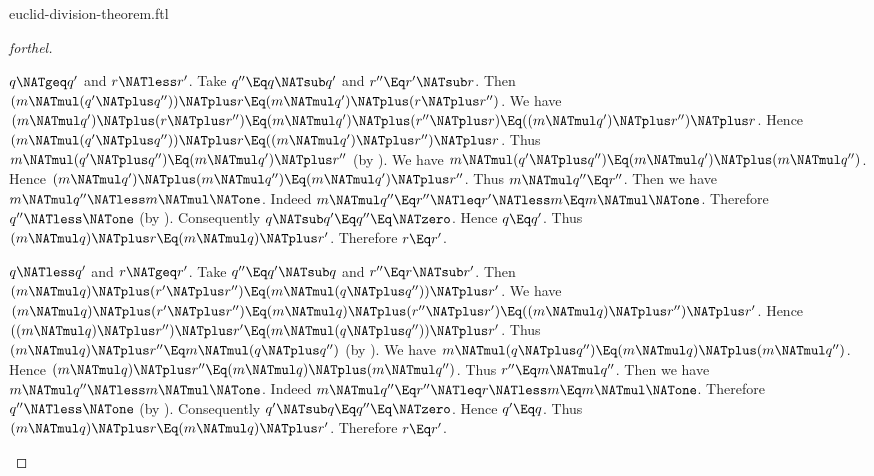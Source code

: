 \documentclass{stex}
\begin{document}
\begin{smodule}{euclid-division-theorem.ftl}
\begin{proof}[forthel]
  \begin{case}{$q \NATgeq q'$ and $r \NATless r'$.}
    Take $q'' \Eq q \NATsub q'$ and $r'' \Eq r' \NATsub r$.
    Then $(m \NATmul (q' \NATplus q'')) \NATplus r \Eq (m \NATmul q') \NATplus (r \NATplus r'')$.
    We have $(m \NATmul q') \NATplus (r \NATplus r'')
      \Eq (m \NATmul q') \NATplus (r'' \NATplus r)
      \Eq ((m \NATmul q') \NATplus r'') \NATplus r$.
    Hence $(m \NATmul (q' \NATplus q'')) \NATplus r \Eq ((m \NATmul q') \NATplus r'') \NATplus r$.
    Thus $m \NATmul (q' \NATplus q'') \Eq (m \NATmul q') \NATplus r''$ (by ).
    We have $m \NATmul (q' \NATplus q'') \Eq (m \NATmul q') \NATplus (m \NATmul q'')$.
    Hence $(m \NATmul q') \NATplus (m \NATmul q'') \Eq (m \NATmul q') \NATplus r''$.
    Thus $m \NATmul q'' \Eq r''$.
    Then we have $m \NATmul q'' \NATless m \NATmul \NATone$.
    Indeed $m \NATmul q''
      \Eq r''
      \NATleq r'
      \NATless m
      \Eq m \NATmul \NATone$.
    Therefore $q'' \NATless \NATone$ (by ).
    Consequently $q \NATsub q' \Eq q'' \Eq \NATzero$.
    Hence $q \Eq q'$.
    Thus $(m \NATmul q) \NATplus r \Eq (m \NATmul q) \NATplus r'$.
    Therefore $r \Eq r'$.
  \end{case}

  \begin{case}{$q \NATless q'$ and $r \NATgeq r'$.}
    Take $q'' \Eq q' \NATsub q$ and $r'' \Eq r \NATsub r'$.
    Then $(m \NATmul q) \NATplus (r' \NATplus r'') \Eq (m \NATmul (q \NATplus q'')) \NATplus r'$.
    We have $(m \NATmul q) \NATplus (r' \NATplus r'')
      \Eq (m \NATmul q) \NATplus (r'' \NATplus r')
      \Eq ((m \NATmul q) \NATplus r'') \NATplus r'$.
    Hence $((m \NATmul q) \NATplus r'') \NATplus r' \Eq (m \NATmul (q \NATplus q'')) \NATplus r'$.
    Thus $(m \NATmul q) \NATplus r'' \Eq m \NATmul (q \NATplus q'')$ (by ).
    We have $m \NATmul (q \NATplus q'') \Eq (m \NATmul q) \NATplus (m \NATmul q'')$.
    Hence $(m \NATmul q) \NATplus r'' \Eq (m \NATmul q) \NATplus (m \NATmul q'')$.
    Thus $r'' \Eq m \NATmul q''$.
    Then we have $m \NATmul q'' \NATless m \NATmul \NATone$.
    Indeed $m \NATmul q''
      \Eq r''
      \NATleq r
      \NATless m
      \Eq m \NATmul \NATone$.
    Therefore $q'' \NATless \NATone$ (by ).
    Consequently $q' \NATsub q \Eq q'' \Eq \NATzero$.
    Hence $q' \Eq q$.
    Thus $(m \NATmul q) \NATplus r \Eq (m \NATmul q) \NATplus r'$.
    Therefore $r \Eq r'$.
  \end{case}


\end{proof}
\end{smodule}
\end{document}
